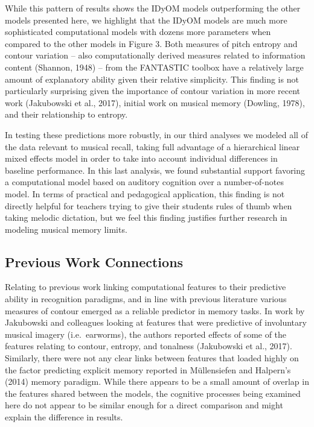 \documentclass[english,man,floatsintext]{apa6}
\begin{document}
While this pattern of results shows the IDyOM models outperforming the other models presented here, we highlight that the IDyOM models are much more sophisticated computational models with dozens more parameters when compared to the other models in Figure 3.
Both measures of pitch entropy and contour variation -- also computationally derived measures related to information content (Shannon, 1948) -- from the FANTASTIC toolbox have a relatively large amount of explanatory ability given their relative simplicity.
This finding is not particularly surprising given the importance of contour variation in more recent work (Jakubowski et al., 2017), initial work on musical memory (Dowling, 1978), and their relationship to entropy.

In testing these predictions more robustly, in our third analyses we modeled all of the data relevant to musical recall, taking full advantage of a hierarchical linear mixed effects model in order to take into account individual differences in baseline performance.
In this last analysis, we found substantial support favoring a computational model based on auditory cognition over a number-of-notes model.
In terms of practical and pedagogical application, this finding is not directly helpful for teachers trying to give their students rules of thumb when taking melodic dictation, but we feel this finding justifies further research in modeling musical memory limits.

\hypertarget{previous-work-connections}{%
\subsection{Previous Work Connections}\label{previous-work-connections}}

Relating to previous work linking computational features to their predictive ability in recognition paradigms, and in line with previous literature various measures of contour emerged as a reliable predictor in memory tasks.
In work by Jakubowski and colleagues looking at features that were predictive of involuntary musical imagery (i.e.~earworms), the authors reported effects of some of the features relating to contour, entropy, and tonalness (Jakubowski et al., 2017).
Similarly, there were not any clear links between features that loaded highly on the factor predicting explicit memory reported in Müllensiefen and Halpern's (2014) memory paradigm.
While there appears to be a small amount of overlap in the features shared between the models, the cognitive processes being examined here do not appear to be similar enough for a direct comparison and might explain the difference in results.
\end{document}
